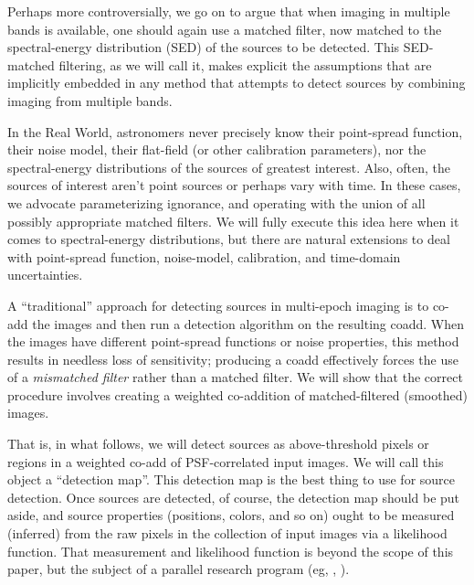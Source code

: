 \documentclass[11pt,letterpaper,linenumbers]{aastex63}
\begin{document}
Perhaps more controversially, we go on to argue that when imaging in
multiple bands is available, one should again use a matched filter,
now matched to the spectral-energy distribution (SED) of the sources
to be detected.  This SED-matched filtering, as we will call it, makes
explicit the assumptions that are implicitly embedded in any method
that attempts to detect sources by combining imaging from multiple
bands.

In the Real World, astronomers never precisely know their point-spread
function, their noise model, their flat-field (or other calibration
parameters), nor the spectral-energy distributions of the sources of
greatest interest.
Also, often, the sources of interest aren't point sources or perhaps
vary with time.
In these cases, we advocate parameterizing ignorance, and operating
with the union of all possibly appropriate matched filters.
We will fully execute this idea here when it comes to spectral-energy
distributions, but there are natural extensions to deal with
point-spread function, noise-model, calibration, and time-domain
uncertainties.



A ``traditional'' approach for detecting sources in multi-epoch
imaging is to co-add the images and then run a detection algorithm on
the resulting coadd.  When the images have different point-spread
functions or noise properties, this method results in needless loss of
sensitivity; producing a coadd effectively forces the use of a
\emph{mismatched filter} rather than a matched filter.  We will show
that the correct procedure involves creating a weighted co-addition of
matched-filtered (smoothed) images.



That is, in what follows, we will detect sources as above-threshold
pixels or regions in a weighted co-add of PSF-correlated input images.
We will call this object a ``detection map''.  This detection map is
the best thing to use for source detection.  Once sources are
detected, of course, the detection map should be put aside, and source
properties (positions, colors, and so on) ought to be measured
(inferred) from the raw pixels in the collection of input images via a
likelihood function.  That measurement and likelihood function is
beyond the scope of this paper, but the subject of a parallel research
program (eg, \cite{unwise-phot}, \cite{lsoverview}).
\end{document}

